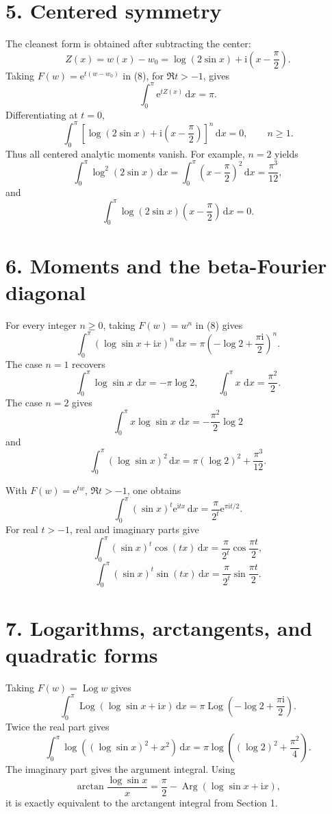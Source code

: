 \documentclass[12pt]{article}
\newcommand{\dd}{\,\mathrm{d}}
\newcommand{\ii}{\mathrm{i}}
\newcommand{\e}{\mathrm{e}}
\newcommand{\Log}{\operatorname{Log}}
\newcommand{\Arg}{\operatorname{Arg}}
\begin{document}
\section*{5. Centered symmetry}

The cleanest form is obtained after subtracting the center:
\[
Z(x)=w(x)-w_0
=\log(2\sin x)+\ii\left(x-\frac{\pi}{2}\right).
\]
Taking \(F(w)=\e^{t(w-w_0)}\) in (8), for \(\Re t>-1\), gives
\[
\boxed{\displaystyle
\int_0^\pi \e^{tZ(x)}\dd x=\pi.}
\tag{11}
\]
Differentiating at \(t=0\),
\[
\boxed{\displaystyle
\int_0^\pi
\left[
\log(2\sin x)+\ii\left(x-\frac{\pi}{2}\right)
\right]^n\dd x=0,
\qquad n\ge1.}
\tag{12}
\]
Thus all centered analytic moments vanish. For example, \(n=2\) yields
\[
\int_0^\pi\log^2(2\sin x)\dd x
=
\int_0^\pi\left(x-\frac{\pi}{2}\right)^2\dd x
=\frac{\pi^3}{12},
\]
and
\[
\int_0^\pi
\log(2\sin x)\left(x-\frac{\pi}{2}\right)\dd x=0.
\]

\section*{6. Moments and the beta-Fourier diagonal}

For every integer \(n\ge0\), taking \(F(w)=w^n\) in (8) gives
\[
\boxed{\displaystyle
\int_0^\pi
\left(\log\sin x+\ii x\right)^n\dd x
=
\pi\left(-\log2+\frac{\pi\ii}{2}\right)^n.}
\tag{13}
\]
The case \(n=1\) recovers
\[
\int_0^\pi\log\sin x\,\dd x=-\pi\log2,
\qquad
\int_0^\pi x\,\dd x=\frac{\pi^2}{2}.
\]
The case \(n=2\) gives
\[
\int_0^\pi x\log\sin x\,\dd x=-\frac{\pi^2}{2}\log2
\]
and
\[
\int_0^\pi(\log\sin x)^2\dd x
=\pi(\log2)^2+\frac{\pi^3}{12}.
\]

With \(F(w)=\e^{tw}\), \(\Re t>-1\), one obtains
\[
\boxed{\displaystyle
\int_0^\pi
(\sin x)^t\e^{\ii tx}\dd x
=
\frac{\pi}{2^t}\e^{\pi\ii t/2}.}
\tag{14}
\]
For real \(t>-1\), real and imaginary parts give
\[
\int_0^\pi(\sin x)^t\cos(tx)\dd x
=\frac{\pi}{2^t}\cos\frac{\pi t}{2},
\]
\[
\int_0^\pi(\sin x)^t\sin(tx)\dd x
=\frac{\pi}{2^t}\sin\frac{\pi t}{2}.
\]

\section*{7. Logarithms, arctangents, and quadratic forms}

Taking \(F(w)=\Log w\) gives
\[
\boxed{\displaystyle
\int_0^\pi
\Log\!\left(\log\sin x+\ii x\right)\dd x
=
\pi\Log\!\left(-\log2+\frac{\pi\ii}{2}\right).}
\tag{15}
\]
Twice the real part gives
\[
\boxed{\displaystyle
\int_0^\pi
\log\!\left((\log\sin x)^2+x^2\right)\dd x
=
\pi\log\!\left((\log2)^2+\frac{\pi^2}{4}\right).}
\tag{16}
\]
The imaginary part gives the argument integral. Using
\[
\arctan\frac{\log\sin x}{x}
=
\frac{\pi}{2}
-\Arg(\log\sin x+\ii x),
\]
it is exactly equivalent to the arctangent integral from Section 1.
\end{document}
